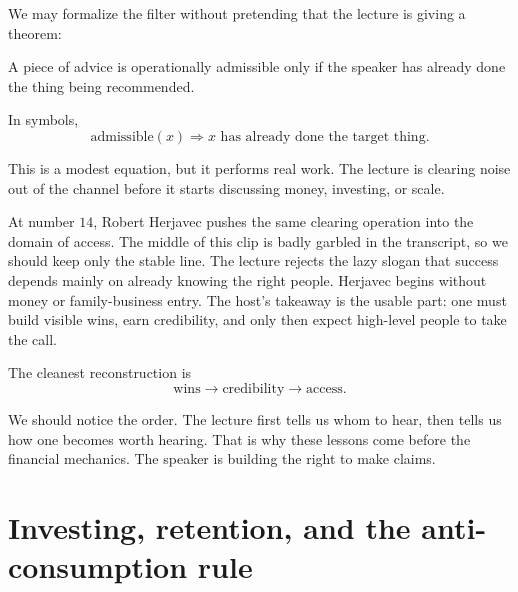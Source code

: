 We may formalize the filter without pretending that the lecture is giving a theorem:
\begin{definition}
A piece of advice is operationally admissible only if the speaker has already done the thing being recommended.
\end{definition}

In symbols,
\begin{equation}
\mathrm{admissible}(x) \Rightarrow x \text{ has already done the target thing.}
\end{equation}

This is a modest equation, but it performs real work. The lecture is clearing noise out of the channel before it starts discussing money, investing, or scale.

At number \(14\), Robert Herjavec pushes the same clearing operation into the domain of access. The middle of this clip is badly garbled in the transcript, so we should keep only the stable line. The lecture rejects the lazy slogan that success depends mainly on already knowing the right people. Herjavec begins without money or family-business entry. The host's takeaway is the usable part: one must build visible wins, earn credibility, and only then expect high-level people to take the call.

The cleanest reconstruction is
\begin{equation}
\text{wins} \longrightarrow \text{credibility} \longrightarrow \text{access}.
\end{equation}

\begin{figure}[h]
\centering
{}
\end{figure}

We should notice the order. The lecture first tells us whom to hear, then tells us how one becomes worth hearing. That is why these lessons come before the financial mechanics. The speaker is building the right to make claims.

\section{Investing, retention, and the anti-consumption rule}

